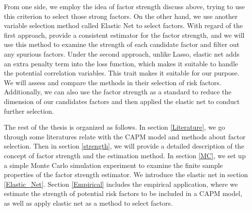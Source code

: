 From one side, we employ the idea of factor strength discuss above, trying to use this criterion to select those strong factors.
On the other hand, we use another variable selection method called Elastic Net \cite{Zou2005} to select factors.
With regard of the first approach,  provide a consistent estimator for the factor strength, and we will use this method to examine the strength of each candidate factor and filter out any spurious factors.
Under the second approach, unlike Lasso, elastic net adds an extra penalty term into the loss function, which makes it suitable to handle the potential correlation variables.
This trait makes it suitable for our purpose.
We will assess and compare the methods in their selection of risk factors.
Additionally, we can also use the factor strength as a standard to reduce the dimension of our candidates factors and then applied the elastic net to conduct further selection.


The rest of the thesis is organized as follows.
In section \ref{Literature}, we go through some literatures relate with the CAPM model and methods about factor selection.
Then in section \ref{strength}, we will provide a detailed description of the concept of factor strength and the estimation method.
In section \ref{MC}, we set up a simple Monte Carlo simulation experiment to examine the finite sample properties of the factor strength estimator.
We introduce the elastic net in section \ref{Elastic_Net}.
Section \ref{Empirical} includes the empirical application, where we estimate the strength of potential risk factors to be included in a CAPM model, as well as apply elastic net as a method to select factors.





